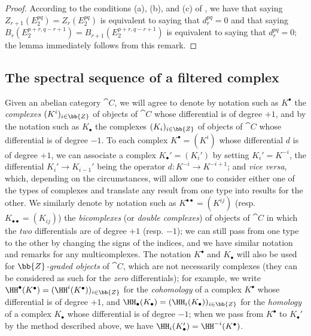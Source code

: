 \begin{proof}
According to the conditions (a), (b), and (c) of , we have that saying $Z_{r+1}(E_2^{pq})=Z_r(E_2^{pq})$ is equivalent to saying that $d_r^{pq}=0$ and that saying $B_r(E_2^{p+r,q-r+1})=B_{r+1}(E_2^{p+r,q-r+1})$ is equivalent to saying that $d_r^{pq}=0$; the lemma immediately follows from this remark.
\end{proof}

\subsection{The spectral sequence of a filtered complex}
\label{subsection:0.11.2}

\begin{env}[11.2.1]
\label{0.11.2.1}
Given an abelian category $\cat{C}$, we will agree to denote by notation such as $K^\bullet$ the \emph{complexes $(K^i)_{i\in\bb{Z}}$} of objects of $\cat{C}$ whose differential is of degree $+1$, and by the notation such as $K_\bullet$ the complexes $(K_i)_{i\in\bb{Z}}$ of objects of $\cat{C}$ whose differential is of degree $-1$.
To each complex $K^\bullet=(K^i)$ whose differential $d$ is of degree $+1$, we can associate a complex $K_\bullet'=(K_i')$ by setting $K_i'=K^{-i}$, the differential $K_i'\to K_{i-1}'$ being the operator $d:K^{-i}\to K^{-i+1}$; and \emph{vice versa}, which, depending on the circumstances, will allow one to consider either one of the types of complexes and translate any result from one type into results for the other.
We similarly denote by notation such as $K^{\bullet\bullet}=(K^{ij})$ (resp. $K_{\bullet\bullet}=(K_{ij})$) the \emph{bicomplexes} (or \emph{double complexes}) of objects of $\cat{C}$ in which the \emph{two} differentials are of degree $+1$ (resp. $-1$); we can still pass from one type to the other by changing the signs of the indices, and we have similar notation and remarks for any multicomplexes.
The notation $K^\bullet$ and $K_\bullet$ will also be used for \emph{$\bb{Z}$-graded objects} of $\cat{C}$, which are not necessarily complexes (they can be considered as such for the \emph{zero} differentials); for example, we write $\HH^\bullet(K^\bullet)=(\HH^i(K^\bullet))_{i\in\bb{Z}}$ for the \emph{cohomology} of a complex $K^\bullet$ whose differential is of degree $+1$, and $\HH_\bullet(K_\bullet)=(\HH_i(K_\bullet))_{i\in\bb{Z}}$ for the \emph{homology} of a complex $K_\bullet$ whose differential is of degree $-1$; when we pass from $K^\bullet$ to $K_\bullet'$ by the method described above, we have $\HH_i(K_\bullet')=\HH^{-i}(K^\bullet)$.


\end{env}
